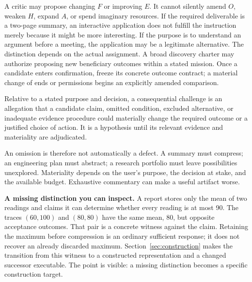 A critic may propose changing $F$ or improving $E$. It cannot silently amend $O$, weaken $H$, expand $A$, or spend imaginary resources. If the required deliverable is a two-page summary, an interactive application does not fulfill the instruction merely because it might be more interesting. If the purpose is to understand an argument before a meeting, the application may be a legitimate alternative. The distinction depends on the actual assignment. A broad discovery charter may authorize proposing new beneficiary outcomes within a stated mission. Once a candidate enters confirmation, freeze its concrete outcome contract; a material change of ends or permissions begins an explicitly amended comparison.

\begin{definition}
Relative to a stated purpose and decision, a consequential challenge is an allegation that a candidate claim, omitted condition, excluded alternative, or inadequate evidence procedure could materially change the required outcome or a justified choice of action. It is a hypothesis until its relevant evidence and materiality are adjudicated.
\end{definition}
An omission is therefore not automatically a defect. A summary must compress; an engineering plan must abstract; a research portfolio must leave possibilities unexplored. Materiality depends on the user's purpose, the decision at stake, and the available budget. Exhaustive commentary can make a useful artifact worse.

\begin{seabox}
\textbf{A missing distinction you can inspect.} A report stores only the mean of two readings and claims it can determine whether every reading is at most 90. The traces $(60,100)$ and $(80,80)$ have the same mean, 80, but opposite acceptance outcomes. That pair is a concrete witness against the claim. Retaining the maximum before compression is an ordinary sufficient response; it does not recover an already discarded maximum. Section~\ref{sec:construction} makes the transition from this witness to a constructed representation and a changed successor executable. The point is visible: a missing distinction becomes a specific construction target.
\end{seabox}

